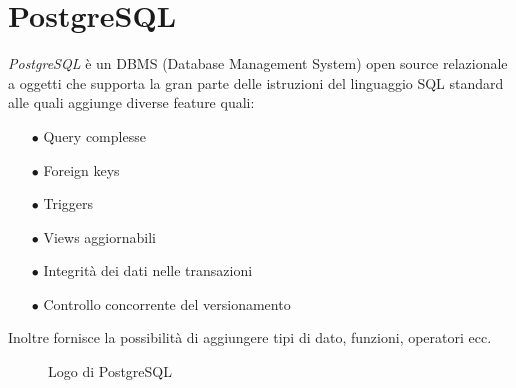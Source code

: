 \section{PostgreSQL}\label{sec:postgresql}
\emph{PostgreSQL} è un DBMS (Database Management System) open source relazionale a oggetti che supporta la gran parte delle istruzioni del linguaggio SQL standard alle quali aggiunge diverse feature quali:
\begin{itemize}
	\item[$\bullet$]Query complesse
	\item[$\bullet$]Foreign keys
	\item[$\bullet$]Triggers
	\item[$\bullet$]Views aggiornabili
	\item[$\bullet$]Integrità dei dati nelle transazioni
	\item[$\bullet$]Controllo concorrente del versionamento
\end{itemize}
Inoltre fornisce la possibilità di aggiungere tipi di dato, funzioni, operatori ecc. \cite{PostgreSQL}
\begin{figure}[ht]
	\centering
	\caption{Logo di PostgreSQL}
	\label{fig:one}
\end{figure}


